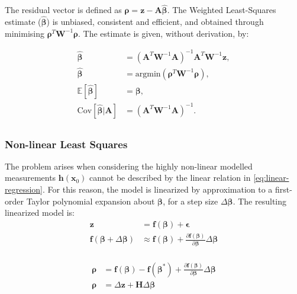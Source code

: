 The residual vector is defined as $\bm{\rho}=\bm{z}-\bm{A}\hat{\bm{\beta}}$. The
Weighted Least-Squares estimate ($\bm{\hat{\beta}}$) is unbiased, consistent and
efficient, and obtained through minimising $\bm{\rho}^T\bm{W}^{-1}\bm{\rho}$.
The estimate is given, without derivation, by:


$$
\begin{equation}
    \begin{aligned}
        \bm{\hat{\beta}} &= (\bm{A}^T\bm{W}^{-1}\bm{A})^{-1}\bm{A}^T\bm{W}^{-1}\bm{z}, \\
        \bm{\hat{\beta}} &= \text{argmin}(\bm{\rho}^T\bm{W}^{-1}\bm{\rho}), \\
        \mathbb{E}[\bm{\hat{\beta}}] &= \bm{\beta}, \\
        \text{Cov}[\bm{\hat{\beta}}|\bm{A}] &= (\bm{A}^T\bm{W}^{-1}\bm{A})^{-1}. \\
    \end{aligned}
\end{equation}
$$

\subsubsection{Non-linear Least Squares}

The problem arises when considering the highly non-linear modelled measurements
$\bm{h}(\bm{x}_0)$ cannot be described by the linear relation in
\autoref{eq:linear-regression}. For this reason, the model is linearized by
approximation to a first-order Taylor polynomial expansion about $\bm{\beta}$,
for a step size $\Delta\bm{\beta}$. The resulting linearized model is:
\begin{equation}
    \begin{aligned}
        \bm{z}                              &=        \bm{f}(\bm{\beta}) + \bm{\epsilon}                                                              \\
        \bm{f}(\bm{\beta}+\Delta\bm{\beta}) &\approx  \bm{f}(\bm{\beta}) + \frac{\partial{\bm{f}(\bm{\beta})}}{\partial{\bm{\beta}}}\Delta\bm{\beta}  \\
    \end{aligned}
\end{equation}

\begin{equation}
    \begin{aligned}
        \bm{\rho} &= \bm{f}(\bm{\beta}) - \bm{f}(\bm{\beta}^*)  + \frac{\partial{\bm{f}(\bm{\beta})}}{\partial{\bm{\beta}}}\Delta\bm{\beta}  \\
        \bm{\rho} &= \Delta\bm{z}  + \bm{H}\Delta\bm{\beta}  \\
    \end{aligned}
\end{equation}

